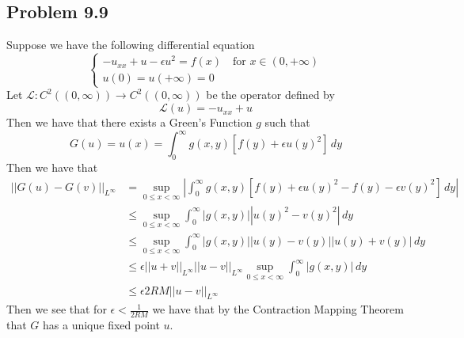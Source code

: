 \documentclass[12pt]{report}
\newcommand{\norm}[1]{\left|\left|#1\right|\right|}
\begin{document}
\subsection*{Problem 9.9}
Suppose we have the following differential equation
\begin{equation*}
  \begin{cases}
    -u_{xx} + u - \epsilon u^2 = f(x) \quad \text{for $x \in (0, +\infty)$} \\
    u(0) = u(+\infty) = 0  
  \end{cases}
\end{equation*}
Let $\mathcal{L}: C^2((0,\infty)) \to C^2((0,\infty))$ be the operator defined by
\begin{equation*}
  \mathcal{L}(u) = -u_{xx} + u
\end{equation*}
Then we have that there exists a Green's Function $g$ such that
\begin{equation*}
  G(u) = u(x) = \int_0^\infty g(x,y) \left[f(y) + \epsilon u(y)^2\right] \, dy
\end{equation*}
Then we have that 
\begin{align*}
  \norm{G(u) - G(v)}_{L^\infty} &= \sup_{0 \leq x < \infty} \left| \int_0^\infty g(x,y) \left[ f(y) + \epsilon u(y)^2 - f(y) - \epsilon v(y)^2 \right] \, dy \right| \\
  &\leq \sup_{0 \leq x < \infty} \int_0^\infty |g(x,y)| \left| u(y)^2 - v(y)^2 \right| \, dy \\
  &\leq \sup_{0 \leq x < \infty} \int_0^\infty |g(x,y)| \left| u(y) - v(y) \right| \left| u(y) + v(y) \right| \, dy \\
  &\leq \epsilon \norm{u + v}_{L^\infty} \norm{u-v}_{L^\infty} \sup_{0 \leq x < \infty} \int_0^\infty |g(x,y)| \, dy \\
  &\leq \epsilon 2RM \norm{u-v}_{L^\infty}
\end{align*} 
Then we see that for $\epsilon < \frac{1}{2RM}$ we have that by the Contraction Mapping Theorem that $G$ has a unique fixed point $u$.
\end{document}
